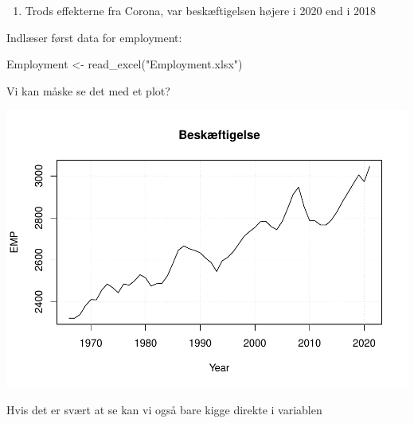 \documentclass[
  12pt,
]{article}
\newenvironment{Shaded}{\begin{snugshade}}{\end{snugshade}}
\newcommand{\AttributeTok}[1]{\textcolor[rgb]{0.77,0.63,0.00}{#1}}
\newcommand{\FunctionTok}[1]{\textcolor[rgb]{0.00,0.00,0.00}{#1}}
\newcommand{\NormalTok}[1]{#1}
\newcommand{\OtherTok}[1]{\textcolor[rgb]{0.56,0.35,0.01}{#1}}
\newcommand{\SpecialCharTok}[1]{\textcolor[rgb]{0.00,0.00,0.00}{#1}}
\newcommand{\StringTok}[1]{\textcolor[rgb]{0.31,0.60,0.02}{#1}}
\providecommand{\tightlist}{%
  \setlength{\itemsep}{0pt}\setlength{\parskip}{0pt}}
\begin{document}
\begin{enumerate}
\def\labelenumi{\arabic{enumi}.}
\setcounter{enumi}{1}
\tightlist
\item
  Trods effekterne fra Corona, var beskæftigelsen højere i 2020 end i
  2018
\end{enumerate}

Indlæser først data for employment:

\begin{Shaded}
\begin{Highlighting}[]
\NormalTok{Employment }\OtherTok{\textless{}{-}} \FunctionTok{read\_excel}\NormalTok{(}\StringTok{"Employment.xlsx"}\NormalTok{)}
\end{Highlighting}
\end{Shaded}

Vi kan måske se det med et plot?

\begin{Shaded}
\end{Shaded}

\includegraphics{Rkursus_done_files/figure-latex/unnamed-chunk-18-1.pdf}

Hvis det er svært at se kan vi også bare kigge direkte i variablen
\end{document}
